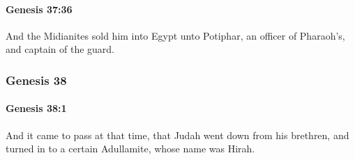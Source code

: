 		\paragraph{Genesis 37:36} %
			\label{GENESIS-37-36}

			And the Midianites sold him into Egypt unto Potiphar, an officer of Pharaoh's, and captain of the guard.

	\subsubsection{Genesis 38} %
		\label{GENESIS-38}

		\paragraph{Genesis 38:1} %
			\label{GENESIS-38-1}

			And it came to pass at that time, that Judah went down from his brethren, and turned in to a certain Adullamite, whose name was Hirah.

